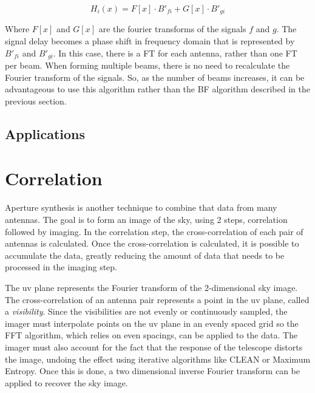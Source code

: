 $$H_i(x) = F[x] \cdot B'_{fi} + G[x] \cdot B'_{gi}$$

Where $F[x]$ and $G[x]$ are the fourier transforms of the signals $f$ and $g$.
The signal delay becomes a phase shift in frequency domain that is represented by $B'_{fi}$ and $B'_{gi}$. 
In this case, there is a FT for each antenna, rather than one FT per beam. 
When forming multiple beams, there is no need to recalculate the Fourier transform of the signals. 
So, as the number of beams increases, it can be advantageous to use this algorithm rather than the BF algorithm described in the previous section. 

\subsection{Applications}



\section{Correlation}
Aperture synthesis is another technique to combine that data from many antennas.
The goal is to form an image of the sky, using 2 steps, correlation followed by imaging.
In the correlation step, the cross-correlation of each pair of antennas is calculated. 
Once the cross-correlation is calculated, it is possible to accumulate the data, greatly reducing the amount of data that needs to be processed in the imaging step.

The uv plane represents the Fourier transform of the 2-dimensional sky image. 
The cross-correlation of an antenna pair represents a point in the uv plane, called a \emph{visibility}. 
Since the visibilities are not evenly or continuously sampled, the imager must interpolate points on the uv plane in an evenly spaced grid so the FFT algorithm, which relies on even spacings, can be applied to the data. 
The imager must also account for the fact that the response of the telescope distorts the image, undoing the effect using iterative algorithms like CLEAN or Maximum Entropy. 
Once this is done, a two dimensional inverse Fourier transform can be applied to recover the sky image. 

